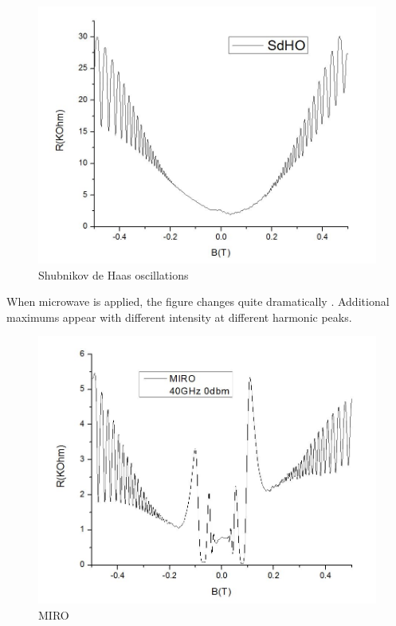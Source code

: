 \documentclass[12pt]{ruthesis}
\begin{document}
\begin{figure}
  \centering
  \includegraphics[totalheight=8cm]{figures/sdho.JPG}
  \caption{Shubnikov de Haas oscillations}
  \label{sdho}
\end{figure}


When microwave is applied, the figure changes quite dramatically . Additional maximums appear with different intensity at different harmonic peaks.

\begin{figure}
  \centering
  \includegraphics[totalheight=8cm]{figures/miro.JPG}
  \caption{MIRO}
  \label{miro}
\end{figure}
 
\end{document}
